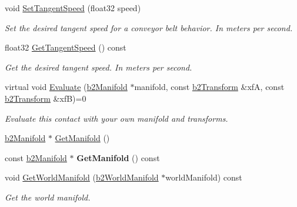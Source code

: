 \begin{DoxyCompactItemize}
\mbox{\label{classb2Contact_a32033914a6c7f35b469e8fddbc17c566}} 
void \hyperlink{classb2Contact_a32033914a6c7f35b469e8fddbc17c566}{Set\+Tangent\+Speed} (float32 speed)
\begin{DoxyCompactList}\small\item\em Set the desired tangent speed for a conveyor belt behavior. In meters per second. \end{DoxyCompactList}\item 
\mbox{\label{classb2Contact_a927125db0b36947a3bb53c4e3eded1cd}} 
float32 \hyperlink{classb2Contact_a927125db0b36947a3bb53c4e3eded1cd}{Get\+Tangent\+Speed} () const
\begin{DoxyCompactList}\small\item\em Get the desired tangent speed. In meters per second. \end{DoxyCompactList}\item 
\mbox{\label{classb2Contact_ae3c2842e5325b2d4500f8ed1d4de2f72}} 
virtual void \hyperlink{classb2Contact_ae3c2842e5325b2d4500f8ed1d4de2f72}{Evaluate} (\hyperlink{structb2Manifold}{b2\+Manifold} $\ast$manifold, const \hyperlink{structb2Transform}{b2\+Transform} \&xfA, const \hyperlink{structb2Transform}{b2\+Transform} \&xfB)=0
\begin{DoxyCompactList}\small\item\em Evaluate this contact with your own manifold and transforms. \end{DoxyCompactList}\item 
\hyperlink{structb2Manifold}{b2\+Manifold} $\ast$ \hyperlink{classb2Contact_a3ed7faaf7a3999e6713714617e56e43f}{Get\+Manifold} ()
\item 
\mbox{\label{classb2Contact_a61c20f566cb4a25077a495e60b9ea10b}} 
const \hyperlink{structb2Manifold}{b2\+Manifold} $\ast$ {\bfseries Get\+Manifold} () const
\item 
\mbox{\label{classb2Contact_a7f5645863f6197fa28cc1baafbd11255}} 
void \hyperlink{classb2Contact_a7f5645863f6197fa28cc1baafbd11255}{Get\+World\+Manifold} (\hyperlink{structb2WorldManifold}{b2\+World\+Manifold} $\ast$world\+Manifold) const
\begin{DoxyCompactList}\small\item\em Get the world manifold. \end{DoxyCompactList}\item 

\end{DoxyCompactItemize}

